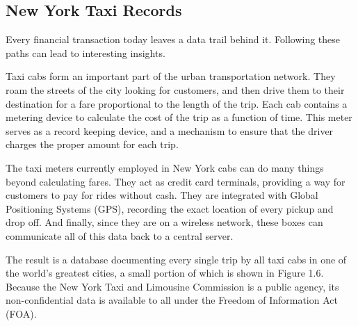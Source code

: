 \documentclass[10pt]{article}
\begin{document}
\subsection{New York Taxi Records}
Every financial transaction today leaves a data trail behind it. Following these paths can lead to interesting insights.

Taxi cabs form an important part of the urban transportation network. They roam the streets of the city looking for customers, and then drive them to their destination for a fare proportional to the length of the trip. Each cab contains a metering device to calculate the cost of the trip as a function of time. This meter serves as a record keeping device, and a mechanism to ensure that the driver charges the proper amount for each trip.

The taxi meters currently employed in New York cabs can do many things beyond calculating fares. They act as credit card terminals, providing a way for customers to pay for rides without cash. They are integrated with Global Positioning Systems (GPS), recording the exact location of every pickup and drop off. And finally, since they are on a wireless network, these boxes can communicate all of this data back to a central server.

The result is a database documenting every single trip by all taxi cabs in one of the world's greatest cities, a small portion of which is shown in Figure 1.6. Because the New York Taxi and Limousine Commission is a public agency, its non-confidential data is available to all under the Freedom of Information Act (FOA).
\end{document}
